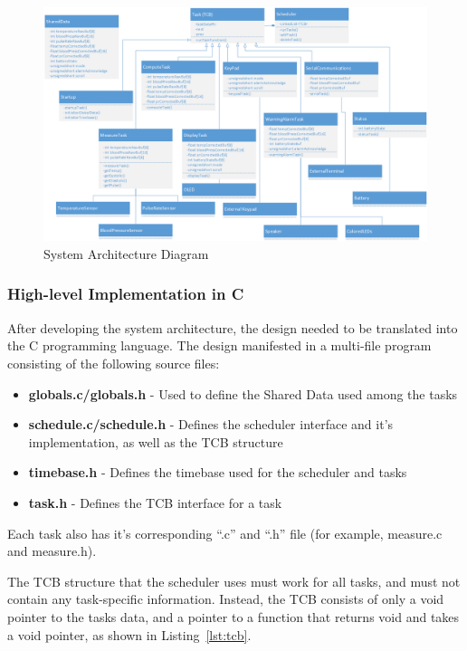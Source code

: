 \documentclass[12pt]{article} %
\begin{document}
    \begin{figure}[h]
      \centering
      \includegraphics[width=\textwidth]{../design/System_Architecture}
      \caption{System Architecture Diagram}
      \label{fig:arch}
    \end{figure}

    \subsubsection{High-level Implementation in C}
    After developing the system architecture, the design needed to be translated into the C programming language. The design manifested in a multi-file program consisting of the following source files:
    \begin{itemize}
      \item \textbf{globals.c/globals.h} - Used to define the Shared Data used among the tasks
      \item \textbf{schedule.c/schedule.h} - Defines the scheduler interface and it's implementation, as well as the TCB structure
      \item \textbf{timebase.h} - Defines the timebase used for the scheduler and tasks
      \item \textbf{task.h} - Defines the TCB interface for a task
    \end{itemize}
    Each task also has it's corresponding ``.c'' and ``.h'' file (for example, measure.c and measure.h).

    The TCB structure that the scheduler uses must work for all tasks, and must
    not contain any task-specific information. Instead, the TCB consists of
    only a void pointer to the tasks data, and a pointer to a function that
    returns void and takes a void pointer, as shown in Listing~\ref{lst:tcb}.
\end{document}
